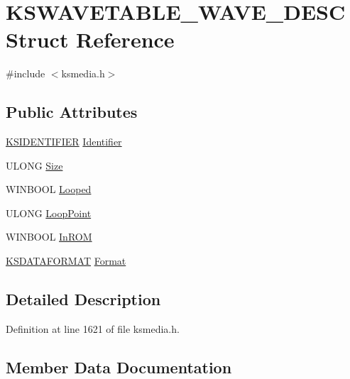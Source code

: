 \hypertarget{struct_k_s_w_a_v_e_t_a_b_l_e___w_a_v_e___d_e_s_c}{}\section{K\+S\+W\+A\+V\+E\+T\+A\+B\+L\+E\+\_\+\+W\+A\+V\+E\+\_\+\+D\+E\+SC Struct Reference}
\label{struct_k_s_w_a_v_e_t_a_b_l_e___w_a_v_e___d_e_s_c}


{\ttfamily \#include $<$ksmedia.\+h$>$}

\subsection*{Public Attributes}
\begin{DoxyCompactItemize}
\item 
\hyperlink{struct_k_s_i_d_e_n_t_i_f_i_e_r}{K\+S\+I\+D\+E\+N\+T\+I\+F\+I\+ER} \hyperlink{struct_k_s_w_a_v_e_t_a_b_l_e___w_a_v_e___d_e_s_c_aedcb13d2d8ae05b022283d15183c150c}{Identifier}
\item 
U\+L\+O\+NG \hyperlink{struct_k_s_w_a_v_e_t_a_b_l_e___w_a_v_e___d_e_s_c_a8242b0c5a830a5a8e53021c1fe29e479}{Size}
\item 
W\+I\+N\+B\+O\+OL \hyperlink{struct_k_s_w_a_v_e_t_a_b_l_e___w_a_v_e___d_e_s_c_a5084916d272204a9e6789388778463c8}{Looped}
\item 
U\+L\+O\+NG \hyperlink{struct_k_s_w_a_v_e_t_a_b_l_e___w_a_v_e___d_e_s_c_af6d912907063c15b71e9b214012172fe}{Loop\+Point}
\item 
W\+I\+N\+B\+O\+OL \hyperlink{struct_k_s_w_a_v_e_t_a_b_l_e___w_a_v_e___d_e_s_c_a3ed3e62356393ecb290252d498c0a9e5}{In\+R\+OM}
\item 
\hyperlink{union_k_s_d_a_t_a_f_o_r_m_a_t}{K\+S\+D\+A\+T\+A\+F\+O\+R\+M\+AT} \hyperlink{struct_k_s_w_a_v_e_t_a_b_l_e___w_a_v_e___d_e_s_c_ab2f957fe18434770d72c79f554112745}{Format}
\end{DoxyCompactItemize}


\subsection{Detailed Description}


Definition at line 1621 of file ksmedia.\+h.



\subsection{Member Data Documentation}
